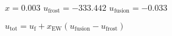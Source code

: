 \( x = 0.003 \)  
\( u_{\text{frost}} = -333.442 \)  
\( u_{\text{fusion}} = -0.033 \)  

\( u_{\text{tot}} = u_{\text{f}} + x_{\text{EW}} (u_{\text{fusion}} - u_{\text{frost}}) \)
